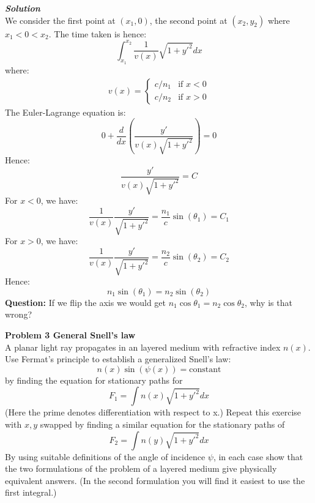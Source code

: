 \begin{framed}
\textbf{\textit{Solution}}\\
We consider the first point at $(x_1, 0)$, the second point at $(x_2,y_2)$ where $x_1<0<x_2$. The time taken is hence:
\begin{equation}
\int_{x_1}^{x_2} \frac{1}{v(x)}\sqrt{1+y'^2}dx
\end{equation}
where:
\begin{equation}
\begin{aligned}
v(x)=
\begin{cases}
    c/n_1 &\text{if } x<0 \\
    c/n_2 &\text{if } x>0
\end{cases}
\end{aligned}
\end{equation}
The Euler-Lagrange equation is:
\begin{equation}
0 + \frac{d}{dx}\left( \frac{y'}{v(x)\sqrt{1+y'^2}} \right)=0
\end{equation}
Hence:
\begin{equation}
\frac{y'}{v(x)\sqrt{1+y'^2}} =C
\end{equation}
For $x<0$, we have:
\begin{equation}
\frac{1}{v(x)}\frac{y'}{\sqrt{1+y'^2}} = \frac{n_1}{c}\sin(\theta_1) = C_1
\end{equation}
For $x>0$, we have:
\begin{equation}
\frac{1}{v(x)}\frac{y'}{\sqrt{1+y'^2}} = \frac{n_2}{c}\sin(\theta_2) = C_2
\end{equation}
Hence:
\begin{equation}
n_1\sin(\theta_1)=n_2\sin(\theta_2)
\end{equation}
\textbf{Question:} If we flip the axis we would get $n_1\cos\theta_1=n_2\cos\theta_2$, why is that wrong?
\end{framed}

\begin{framed}
\textbf{\textbf{Problem 3} General Snell's law}\\
A planar light ray propagates in an layered medium with refractive index $n(x)$. Use Fermat's principle to establish a generalized Snell's law:
\begin{equation}
n(x)\sin(\psi(x))=\text{constant}
\end{equation}
by finding the equation for stationary paths for
\begin{equation}
F_1=\int n(x)\sqrt{1+y'^2}dx
\end{equation}
(Here the prime denotes differentiation with respect to x.) Repeat this exercise with $x,y$ swapped by finding a similar equation for the stationary paths of
\begin{equation}
F_2=\int n(y)\sqrt{1+y'^2}dx
\end{equation}
By using suitable definitions of the angle of incidence $\psi$, in each case show that the two formulations of the problem of a layered medium give physically equivalent answers.
(In the second formulation you will find it easiest to use the first integral.)
\end{framed}

